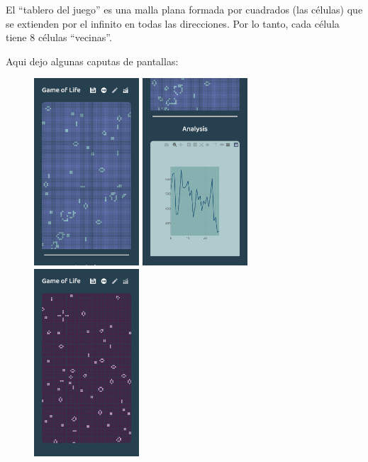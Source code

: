 \documentclass[12pt, fleqn]{report}                             %
\theoremstyle{break}                                            %
\begin{document}
    El “tablero del juego” es una malla plana formada
    por cuadrados (las células) que se extienden por el infinito en todas las
    direcciones. Por lo tanto, cada célula tiene 8 células “vecinas”.

      Aqui dejo algunas caputas de pantallas:
      \begin{figure}[ht!]
        \centering
        \includegraphics[width=0.35\textwidth]{Game1.png}
        \includegraphics[width=0.35\textwidth]{Game2.png}
        \includegraphics[width=0.35\textwidth]{Game3.png}

\end{figure}
\end{document}
